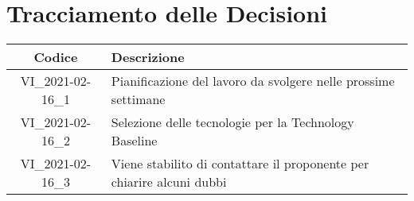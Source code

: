 \section*{Tracciamento delle Decisioni}

\begin{center}
	\begin{longtable}{|c|p{13cm}|}
	\hline
	\rowcolor{lighter-grayer}
	\textbf{Codice} & \textbf{Descrizione} \\
	\hline
	\endfirsthead

	\hline
	VI\_2021-02-16\_1 & Pianificazione del lavoro da svolgere nelle prossime settimane \\
	\hline
	VI\_2021-02-16\_2 & Selezione delle tecnologie per la Technology Baseline \\
	\hline
	VI\_2021-02-16\_3 & Viene stabilito di contattare il proponente per chiarire alcuni dubbi \\
	\hline

	

	\end{longtable}
\end{center}